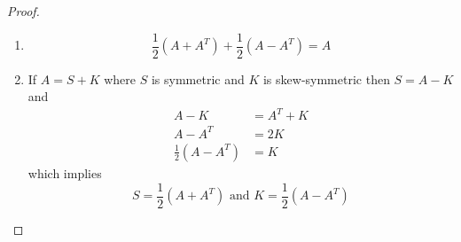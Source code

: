 \begin{exercise}
\begin{proof}
\begin{enumerate}
            and 
            
            \begin{align*}
                \left[ \frac{1}{2}\left(A - A^T\right) \right]_{ij} &= \frac{1}{2}\left[ A - A^T \right]_{ij} \\
                &= \frac{1}{2} \left( [A]_{ij} - \left[A^T\right]_{ij} \right) \\
                &= \frac{1}{2} \left( [A]_{ij} - [A]_{ji} \right) \\
                &= \frac{1}{2} \left( [A^T]_{ji} - [A]_{ji} \right) \\
                &= -\frac{1}{2} \left( [A]_{ji} - [A^T]_{ji} \right) \\
                &= -\frac{1}{2} \left[A-A^T\right]_{ji} \\
                &= \left[ -\frac{1}{2}\left(A-A^T\right) \right]_{ji}
            \end{align*}
            
            A simpler proof would be to observe
            \[ \left( A + A^T \right)^T = A^T + A = A + A^T \]
            and
            \[ \left( A - A^T \right)^T = A^T - A = -(A - A^T) \]
            
            \item
            \[ \frac{1}{2}(A + A^T) + \frac{1}{2}(A - A^T) = A \]
            
            \item If \( A = S + K \) where \( S \) is symmetric and \( K \) is skew-symmetric then \( S = A - K \) and
            \begin{align*}
                A - K &= A^T + K \\
                A - A^T &= 2K \\
                \frac{1}{2}\left( A - A^T \right) &= K
            \end{align*}
            which implies
            \[ S = \frac{1}{2}\left( A + A^T \right) \text{ and } K = \frac{1}{2}\left( A - A^T \right) \]
        \end{enumerate}
    \end{proof}
\end{exercise} %

